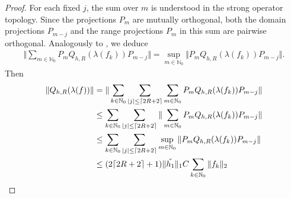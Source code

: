 \documentclass[12pt,a4paper,oneside,final,reqno]{amsart}
\newcommand{\N}{\mathbb{N}}
\theoremstyle{plain}
\theoremstyle{definition}
\begin{document}
\begin{proof}
    For each fixed $j$, the sum over $m$ is understood in the strong operator topology. Since the projections $P_m$ are mutually orthogonal, both the domain projections $P_{m-j}$ and the range projections $P_m$ in this sum are pairwise orthogonal. Analogously to \cite{OzawaRieffel2005}, we deduce
    \begin{align*}
        \Vert \sum_{m\in \N_0} P_m Q_{h,R}(\lambda(f_k)) P_{m-j}\Vert = \sup_{m \in \N_0} \Vert P_m Q_{h,R}(\lambda(f_k)) P_{m-j} \Vert .
    \end{align*}
    Then
    \begin{align*}
        \Vert Q_{h,R}(\lambda(f)) \Vert &= \Vert \sum_{k \in \N_0}\sum_{|j|\leq \lceil 2R+2\rceil} \sum_{m\in \N_0} P_m Q_{h,R} (\lambda(f_k)) P_{m-j} \Vert \notag \\
        &\leq \sum_{k \in \N_0} \sum_{|j|\leq \lceil 2R +2 \rceil} \Vert \sum_{m\in \N_0} P_m Q_{h,R}(\lambda(f_k)) P_{m-j}\Vert \notag \\
        &\leq \sum_{k \in \N_0} \sum_{|j|\leq \lceil 2R +2 \rceil} \sup_{m \in \N_0} \Vert P_m Q_{h,R}(\lambda(f_k)) P_{m-j} \Vert  \notag \\
        &\leq (2 \lceil 2R +2 \rceil +1) \Vert \check{h_1}\Vert_1 C \sum_{k\in \N_0} \Vert f_k \Vert_2
    \end{align*}
    
    
    


\end{proof}
\end{document}
